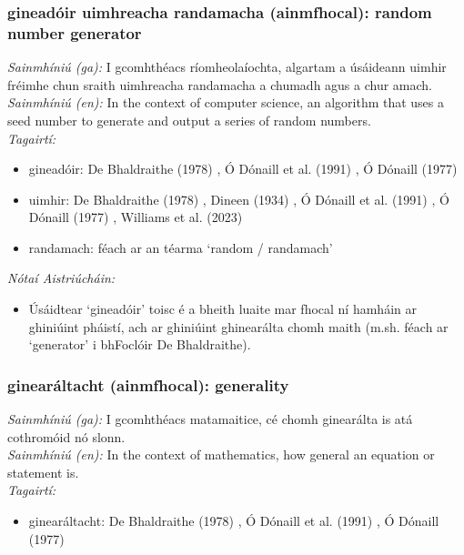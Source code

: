 \documentclass{article}
\begin{document}
\subsubsection*{gineadóir uimhreacha randamacha (ainmfhocal): random number generator}
 \noindent \textit{Sainmhíniú (ga):} I gcomhthéacs ríomheolaíochta, algartam a úsáideann uimhir fréimhe chun sraith uimhreacha randamacha a chumadh agus a chur amach.
\\
 \noindent \textit{Sainmhíniú (en):} In the context of computer science, an algorithm that uses a seed number to generate and output a series of random numbers.
\\
 \noindent \textit{Tagairtí:}
\begin{itemize}
	\item gineadóir: De Bhaldraithe (1978) \cite{de-bhaldraithe}, Ó Dónaill et al. (1991) \cite{focloir-beag}, Ó Dónaill (1977) \cite{odonaill}
	\item uimhir: De Bhaldraithe (1978) \cite{de-bhaldraithe}, Dineen (1934) \cite{dineen}, Ó Dónaill et al. (1991) \cite{focloir-beag}, Ó Dónaill (1977) \cite{odonaill}, Williams et al. (2023) \cite{storchiste}
	\item randamach: féach ar an téarma `random / randamach'
\end{itemize}

 \noindent \textit{Nótaí Aistriúcháin:}
\begin{itemize}
	\item Úsáidtear `gineadóir' toisc é a bheith luaite mar fhocal ní hamháin ar ghiniúint pháistí, ach ar ghiniúint ghinearálta chomh maith (m.sh. féach ar `generator' i bhFoclóir De Bhaldraithe).
\end{itemize}


\subsubsection*{ginearáltacht (ainmfhocal): generality}
 \noindent \textit{Sainmhíniú (ga):} I gcomhthéacs matamaitice, cé chomh ginearálta is atá cothromóid nó slonn.
\\
 \noindent \textit{Sainmhíniú (en):} In the context of mathematics, how general an equation or statement is.
\\
 \noindent \textit{Tagairtí:}
\begin{itemize}
	\item ginearáltacht: De Bhaldraithe (1978) \cite{de-bhaldraithe}, Ó Dónaill et al. (1991) \cite{focloir-beag}, Ó Dónaill (1977) \cite{odonaill}
\end{itemize}
\end{document}
